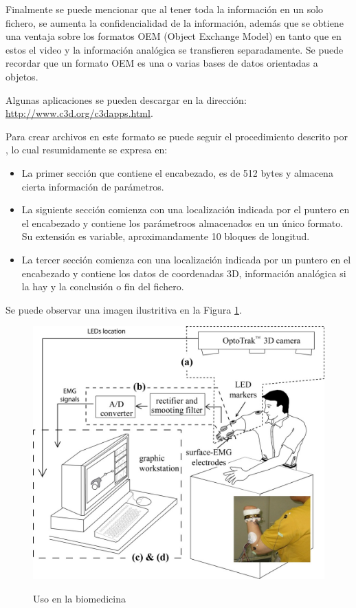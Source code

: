 \documentclass[11pt,letterpaper]{article}     %
\begin{document}
Finalmente se puede mencionar que al tener toda la informaci\' on en un solo fichero, se aumenta la confidencialidad de la informaci\' on, adem\' as que se obtiene una ventaja sobre los formatos OEM (Object Exchange Model) en tanto que en estos el video y la informaci\' on anal\' ogica se transfieren separadamente. Se puede recordar que un formato OEM es una o varias bases de datos orientadas a objetos. 

Algunas aplicaciones se pueden descargar en la direcci\' on: \href{url}{http://www.c3d.org/c3dapps.html}.

Para crear archivos en este formato se puede seguir el procedimiento descrito por \cite{c3d_pdf}, lo cual resumidamente se expresa en:
\begin{itemize}
\item La primer secci\' on que contiene el encabezado, es de 512 bytes y almacena cierta informaci\' on de par\' ametros.
\item La siguiente secci\' on comienza con una localizaci\' on indicada por el puntero en el encabezado y contiene los par\' ametroos almacenados en un \' unico formato. Su extensi\' on es variable, aproximandamente 10 bloques de longitud.
\item La tercer secci\' on comienza con una localizaci\' on indicada por un puntero en el encabezado y contiene los datos de coordenadas 3D, informaci\' on anal\' ogica si la hay y la conclusi\' on o fin del fichero.
\end{itemize}

Se puede observar una imagen ilustritiva en la Figura \ref{fig:c3d1}.

\begin{figure}[hbtp]
\caption{Uso en la biomedicina}
\centering
\includegraphics[scale=0.65]{imagenes/image22.jpeg}
\label{fig:c3d1}
\end{figure}
\end{document}
